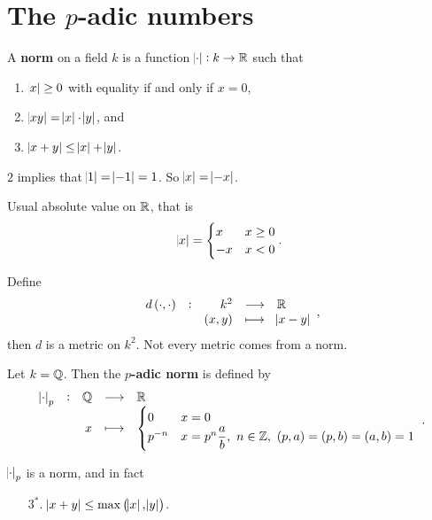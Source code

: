 \pagebreak

\section{The \texorpdfstring{$ p $}{p}-adic numbers}


\begin{definition}
A \textbf{norm} on a field $ k $ is a function $ \abs{\cdot} : k \to \mathbb{R} $ such that
\begin{enumerate}
\item $ \abs{x} \ge 0 $ with equality if and only if $ x = 0 $,
\item $ \abs{xy} = \abs{x} \cdot \abs{y} $, and
\item $ \abs{x + y} \le \abs{x} + \abs{y} $.
\end{enumerate}
\end{definition}

$ 2 $ implies that $ \abs{1} = \abs{-1} = 1 $. So $ \abs{x} = \abs{-x} $.

\begin{example*}
Usual absolute value on $ \mathbb{R} $, that is
$$ \abs{x} =
\begin{cases}
x & x \ge 0 \\
-x & x < 0 \\
\end{cases}.
$$
\end{example*}

\begin{remark}
Define
$$ \function[d\br{\cdot, \cdot}]{k^2}{\RR}{\br{x, y}}{\abs{x - y}}, $$
then $ d $ is a metric on $ k^2 $. Not every metric comes from a norm.
\end{remark}

\begin{definition}
Let $ k = \mathbb{Q} $. Then the \textbf{$ p $-adic norm} is defined by
$$
\function[\abs{\cdot}_p]{\QQ}{\RR}{x}{
\begin{cases}
0 & x = 0 \\
p^{-n} & x = p^n\dfrac{a}{b}, \ n \in \ZZ, \ \br{p, a} = \br{p, b} = \br{a, b} = 1
\end{cases}
}.
$$
\end{definition}

\begin{lemma}
$ \abs{\cdot}_p $ is a norm, and in fact
\begin{enumerate}
\item[$ 3^* $.] $ \abs{x + y} \le \max\br{\abs{x}, \abs{y}} $.
\end{enumerate}
\end{lemma}

